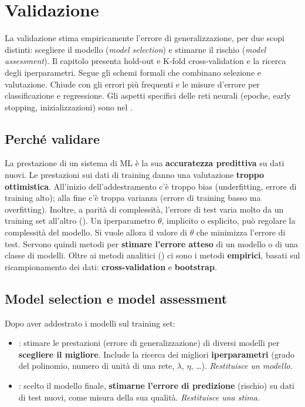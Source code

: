 \chapter{Validazione}
\label{cap:validazione}

\begin{inbreve}
La validazione stima empiricamente l'errore di generalizzazione, per due scopi distinti: scegliere il modello
(\emph{model selection}) e stimarne il rischio (\emph{model assessment}). Il capitolo presenta hold-out e K-fold
cross-validation e la ricerca degli iperparametri. Segue gli schemi formali che combinano selezione e
valutazione. Chiude con gli errori più frequenti e le misure d'errore per classificazione e regressione. Gli
aspetti specifici delle reti neurali (epoche, early stopping, inizializzazioni) sono nel
.
\end{inbreve}

\section{Perché validare}

La prestazione di un sistema di ML è la sua \textbf{accuratezza predittiva} su dati nuovi. Le prestazioni sui
dati di training danno una valutazione \textbf{troppo ottimistica}. All'inizio dell'addestramento c'è troppo
bias (underfitting, errore di training alto); alla fine c'è troppa varianza (errore di training basso ma
overfitting). Inoltre, a parità di complessità, l'errore di test varia molto da un training set all'altro
(). Un iperparametro $\theta$, implicito o esplicito, può regolare la complessità del modello.
Si vuole allora il valore di $\theta$ che minimizza l'errore di test. Servono quindi metodi per \textbf{stimare
l'errore atteso} di un modello o di una classe di modelli. Oltre ai metodi analitici () ci sono
i metodi \textbf{empirici}, basati sul ricampionamento dei dati: \textbf{cross-validation} e \textbf{bootstrap}.

\section{Model selection e model assessment}

\begin{definizione}
Dopo aver addestrato i modelli sul training set:
\begin{itemize}
  \item {}: stimare le prestazioni (errore di generalizzazione) di diversi modelli per
        \textbf{scegliere il migliore}. Include la ricerca dei migliori \textbf{iperparametri} (grado del
        polinomio, numero di unità di una rete, $\lambda$, $\eta$, \dots). \emph{Restituisce un modello.}
  \item {}: scelto il modello finale, \textbf{stimarne l'errore di predizione} (rischio)
        su dati di test nuovi, come misura della sua qualità. \emph{Restituisce una stima.}
\end{itemize}
\end{definizione}

